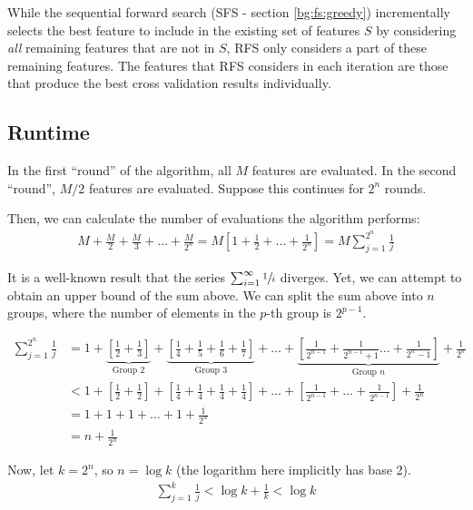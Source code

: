 \documentclass[12pt, twoside, a4paper]{report}
\begin{document}
While the sequential forward search (SFS - section \ref{bg:fs:greedy}) incrementally selects the best feature to include in the existing set of features $S$ by considering \textit{all} remaining features that are not in $S$, RFS only considers a part of these remaining features. The features that RFS considers in each iteration are those that produce the best cross validation results individually.


\subsection{Runtime}
In the first ``round'' of the algorithm, all $M$ features are evaluated. In the second ``round'', $M/2$ features are evaluated. Suppose this continues for $2^n$ rounds.

Then, we can calculate the number of evaluations the algorithm performs:
\begin{align*}
M+\frac{M}{2}+\frac{M}{3}+\dots+\frac{M}{2^n} = M\left[ 1+\frac{1}{2}+\dots+\frac{1}{2^n} \right]=M \sum_{j=1}^{2^n} \frac{1}{j}
\end{align*}

It is a well-known result that the series $\sum_{i=1}^{\infty} \sfrac{1}{i}$ diverges. Yet, we can attempt to obtain an upper bound of the sum above. We can split the sum above into $n$ groups, where the number of elements in the $p$-th group is $2^{p-1}$.

\begin{align*}
\sum_{j=1}^{2^n} \frac{1}{j}
&= 1 + \underbrace{\left[ \frac{1}{2} + \frac{1}{3} \right]}_{\text{Group 2}} + \underbrace{\left[ \frac{1}{4} + \frac{1}{5} + \frac{1}{6} + \frac{1}{7} \right]}_{\text{Group 3}} + \dots + \underbrace{\left[ \frac{1}{2^{n-1}} + \frac{1}{2^{n-1}+1} \dots + \frac{1}{2^{n}-1} \right]}_{\text{Group $n$}} + \frac{1}{2^n} \\
&< 1 + \left[ \frac{1}{2} + \frac{1}{2} \right] + \left[ \frac{1}{4} + \frac{1}{4} + \frac{1}{4} + \frac{1}{4} \right] + \dots + \left[ \frac{1}{2^{n-1}} + \dots + \frac{1}{2^{n-1}} \right] + \frac{1}{2^n} \\
&= 1+1+1+ \dots + 1 + \frac{1}{2^n} \\
&= n + \frac{1}{2^n}
\end{align*}

Now, let $k=2^n$, so $n=\log k$ (the logarithm here implicitly has base 2).
\begin{align*}
\sum_{j=1}^k \frac{1}{j} < \log k+ \frac{1}{k} < \log k
\end{align*}
\end{document}

